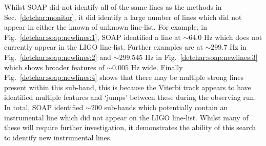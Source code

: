 Whilst SOAP did not identify all of the same lines as the methods in Sec.~\ref{detchar:monitor}, it did identify a large number of lines which did not appear in either the known of unknown line-list.
For example, in Fig.~\ref{detchar:soap:newlines:1}, SOAP identified a line at $\sim 64.0$ Hz which does not currently appear in the \gls{LIGO} line-list.
Further examples are at $\sim 299.7$ Hz in Fig.~\ref{detchar:soap:newlines:2} and $\sim 299.545$ Hz in Fig.~\ref{detchar:soap:newlines:3} which shows broader features of $\sim 0.005$ Hz wide. Finally Fig.~\ref{detchar:soap:newlines:4} shows that there may be multiple strong lines present within this sub-band, this is because the Viterbi track appears to have identified multiple features and `jumps' between these during the observing run.
In total, SOAP identified $\sim 200$ sub-bands which potentially contain an instrumental line which did not appear on the \gls{LIGO} line-list. 
Whilst many of these will require further investigation, it demonstrates the ability of this search to identify new instrumental lines.

